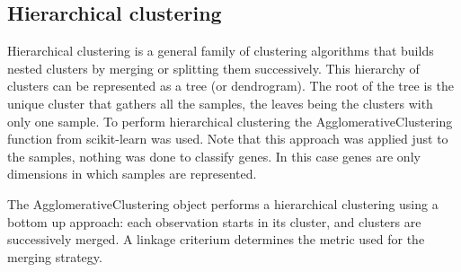 \subsection{Hierarchical clustering}\label{sec:hc}
Hierarchical clustering is a general family of clustering algorithms that builds nested clusters by merging or splitting them successively. This hierarchy of clusters can be represented as a tree (or dendrogram). The root of the tree is the unique cluster that gathers all the samples, the leaves being the clusters with only one sample. To perform hierarchical clustering the AgglomerativeClustering function from scikit-learn was used. Note that this approach was applied just to the samples, nothing was done to classify genes. In this case genes are only dimensions in which samples are represented.

The AgglomerativeClustering object performs a hierarchical clustering using a bottom up approach: each observation starts in its cluster, and clusters are successively merged. A linkage criterium determines the metric used for the merging strategy. 

